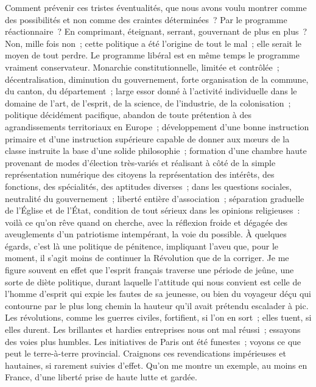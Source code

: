 \documentclass[french,twoside]{book} %
\begin{document}
Comment prévenir ces tristes éventualités, que nous avons voulu montrer comme des possibilités et non comme des craintes déterminées ? Par le programme réactionnaire ? En comprimant, éteignant, serrant, gouvernant de plus en plus ? Non, mille fois non ; cette politique a été l’origine de tout le mal ; elle serait le moyen de tout perdre. Le programme libéral est en même temps le programme vraiment conservateur. Monarchie constitutionnelle, limitée et contrôlée ; décentralisation, diminution du gouvernement, forte organisation de la commune, du canton, du département ; large essor donné à l’activité individuelle dans le domaine de l’art, de l’esprit, de la science, de l’industrie, de la colonisation ; politique décidément pacifique, abandon de toute prétention à des agrandissements territoriaux en Europe ; développement d’une bonne instruction primaire et d’une instruction supérieure capable de donner aux mœurs de la classe instruite la base d’une solide philosophie ; formation d’une chambre haute provenant de modes d’élection très-variés et réalisant à côté de la simple représentation numérique des citoyens la représentation des intérêts, des fonctions, des spécialités, des aptitudes diverses ; dans les questions sociales, neutralité du gouvernement ; liberté entière d’association ; séparation graduelle de l’Église et de l’État, condition de tout sérieux dans les opinions religieuses : voilà ce qu’on rêve quand on cherche, avec la réflexion froide et dégagée des aveuglements d’un patriotisme intempérant, la voie du possible. À quelques égards, c’est là une politique de pénitence, impliquant l’aveu que, pour le moment, il s’agit moins de continuer la Révolution que de la corriger. Je me figure souvent en effet que l’esprit français traverse une période de jeûne, une sorte de diète politique, durant laquelle l’attitude qui nous convient est celle de l’homme d’esprit qui expie les fautes de sa jeunesse, ou bien du voyageur déçu qui contourne par le plus long chemin la hauteur qu’il avait prétendu escalader à pic. Les révolutions, comme les guerres civiles, fortifient, si l’on en sort ; elles tuent, si elles durent. Les brillantes et hardies entreprises nous ont mal réussi ; essayons des voies plus humbles. Les initiatives de Paris ont été funestes ; voyons ce que peut le terre-à-terre provincial. Craignons ces revendications impérieuses et hautaines, si rarement suivies d’effet. Qu’on me montre un exemple, au moins en France, d’une liberté prise de haute lutte et gardée.\par
\end{document}
